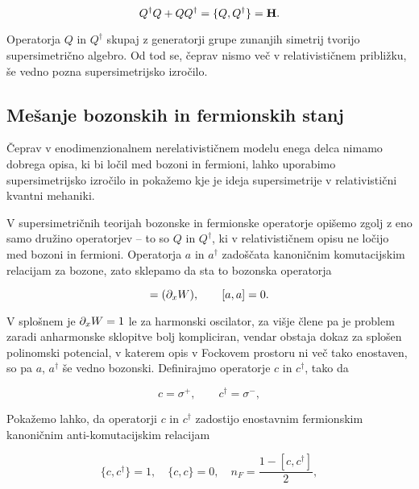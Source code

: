 \begin{equation}
	Q^\dagger Q + QQ^\dagger = \{Q, Q^\dagger\} = \mathbf{H}.
\end{equation}

Operatorja $Q$ in $Q^\dagger$ skupaj z generatorji grupe zunanjih simetrij tvorijo supersimetri\v cno algebro. Od tod
se, \v ceprav nismo ve\v c v relativisti\v cnem pribli\v zku, \v se vedno pozna supersimetrijsko izro\v cilo.

\subsection{Me\v sanje bozonskih in fermionskih stanj}

\v Ceprav v enodimenzionalnem nerelativisti\v cnem modelu enega delca nimamo dobrega opisa, ki bi lo\v cil med bozoni in
fermioni, lahko uporabimo supersimetrijsko izro\v cilo in poka\v zemo kje je ideja supersimetrije v relativisti\v cni
kvantni mehaniki.

V supersimetri\v cnih teorijah bozonske in fermionske operatorje opi\v semo zgolj z eno samo dru\v zino operatorjev -- to
so $Q$ in $Q^\dagger$, ki v relativisti\v cnem opisu ne lo\v cijo med bozoni in fermioni. Operatorja $a$ in $a^\dagger$
zado\v s\v cata kanoni\v cnim komutacijskim relacijam za bozone, zato sklepamo da sta to bozonska operatorja

\begin{equation}
	[a, a^\dagger] = (\px W), \qquad [a, a] = 0.
\end{equation}

\ni V splo\v snem je $\partial_x W = 1$ le za harmonski oscilator, za vi\v sje \v clene pa je problem zaradi anharmonske
sklopitve bolj kompliciran, vendar obstaja dokaz za splo\v sen polinomski potencial, v katerem
opis v Fockovem prostoru ni ve\v c tako enostaven, so pa $a$, $a^\dagger$ \v se vedno bozonski.
Definirajmo operatorje $c$ in $c^\dagger$, tako da

\begin{equation}
	c = \sigma^+, \qquad c^\dagger = \sigma^-,
\end{equation}

\ni Poka\v zemo lahko, da operatorji $c$ in $c^\dagger$ zadostijo enostavnim fermionskim kanoni\v cnim anti-komutacijskim
relacijam

\begin{equation}
	\{c, c^\dagger\} = 1, \quad \{c, c\} = 0, \quad n_F = \frac{1 - [c,c^\dagger]}{2},
\end{equation}


